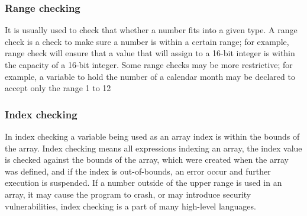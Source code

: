 \documentclass{sig-alternate}
\begin{document}
	\subsubsection{Range checking}
	It is usually used to check that whether a number fits into a given type. A range check is a check to make sure a number is within a certain range; for example, range check will ensure that a value that will assign to a 16-bit integer is within the capacity of a 16-bit integer. Some range checks may be more restrictive; for example, a variable to hold the number of a calendar month may be declared to accept only the range 1 to 12
	
	\subsubsection{Index checking}
	In index checking a variable being used as an array index is within the bounds of the array. Index checking means all expressions indexing an array, the index value is checked against the bounds of the array, which were created when the array was defined, and if the index is out-of-bounds, an error occur and further execution is suspended. If a number outside of the upper range is used in an array, it may cause the program to crash, or may introduce security vulnerabilities, index checking is a part of many high-level languages.
\end{document}
